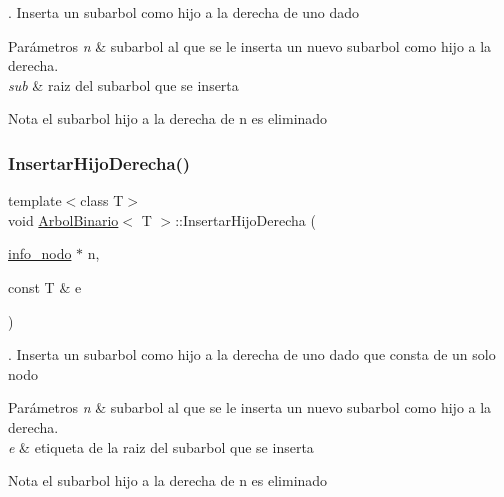 . Inserta un subarbol como hijo a la derecha de uno dado 


\begin{DoxyParams}{Parámetros}
{\em n} & subarbol al que se le inserta un nuevo subarbol como hijo a la derecha. \\
\hline
{\em sub} & raiz del subarbol que se inserta \\
\hline
\end{DoxyParams}
\begin{DoxyNote}{Nota}
el subarbol hijo a la derecha de n es eliminado 
\end{DoxyNote}
\mbox{\label{classArbolBinario_ad625a7ef38fa30f0420b101e1655b4aa}} 
\subsubsection{\texorpdfstring{Insertar\+Hijo\+Derecha()}{InsertarHijoDerecha()}\hspace{0.1cm}{\footnotesize\ttfamily [2/2]}}
{\footnotesize\ttfamily template$<$class T$>$ \\
void \hyperlink{classArbolBinario}{Arbol\+Binario}$<$ T $>$\+::Insertar\+Hijo\+Derecha (\begin{DoxyParamCaption}\item[{\hyperlink{structArbolBinario_1_1info__nodo}{info\+\_\+nodo} $\ast$}]{n,  }\item[{const T \&}]{e }\end{DoxyParamCaption})\hspace{0.3cm}{\ttfamily [private]}}



. Inserta un subarbol como hijo a la derecha de uno dado que consta de un solo nodo 


\begin{DoxyParams}{Parámetros}
{\em n} & subarbol al que se le inserta un nuevo subarbol como hijo a la derecha. \\
\hline
{\em e} & etiqueta de la raiz del subarbol que se inserta \\
\hline
\end{DoxyParams}
\begin{DoxyNote}{Nota}
el subarbol hijo a la derecha de n es eliminado 
\end{DoxyNote}
\mbox{\label{classArbolBinario_aca7d7c365ead3aa2040ffc64e1dfb1f4}} 
